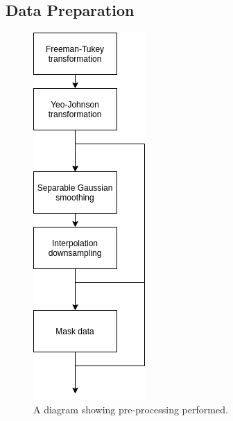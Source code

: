             \subsection{Data Preparation} \label{sec:pca_data_driven_surrogate_signal_extraction_methods_for_dynamic_pet_methods_data_preparation}
                \begin{figure}
                    \centering
                    
                    \includegraphics[width=0.4\linewidth]{figures/data_driven_surrogate_signal_extraction_methods_1_pre_processing.png}
                    
                    \captionsetup{singlelinecheck=false}
                    \caption{
                        A diagram showing pre-processing performed.
                    }
                    \label{fig:pca_data_driven_surrogate_signal_extraction_methods_for_dynamic_pet_methods_pre_processing}
                \end{figure}
                
